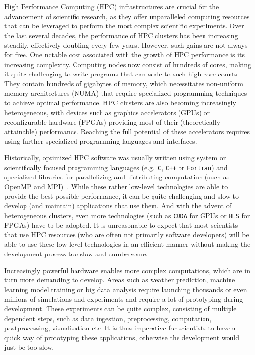 High Performance Computing (HPC) infrastructures are crucial for the advancement of scientific
research, as they offer unparalleled computing resources that can be leveraged to perform the most
complex scientific experiments. Over the last several decades, the performance of HPC clusters
has been increasing steadily, effectively doubling every few years. However, such gains are not
always for free. One notable cost associated with the growth of HPC performance is its
increasing complexity. Computing nodes now consist of hundreds of cores, making it quite
challenging to write programs that can scale to such high core counts. They contain hundreds of
gigabytes of memory, which necessitates non-uniform memory architectures (NUMA) that require
specialized programming techniques to achieve optimal performance. HPC clusters are also becoming
increasingly heterogeneous, with devices such as graphics accelerators (GPUs) or reconfigurable
hardware (FPGAs) providing most of their (theoretically attainable) performance. Reaching the
full potential of these accelerators requires using further specialized programming languages
and interfaces.

Historically, optimized HPC software was usually written using system or scientifically focused
programming languages (e.g.~\texttt{C}, \texttt{C++} or \texttt{Fortran}) and specialized libraries
for parallelizing and distributing computation (such as OpenMP and MPI)~\cite{mpistudy}. While
these rather low-level technologies are able to provide the best possible performance, it can be
quite challenging and slow to develop (and maintain) applications that use them. And with the
advent of heterogeneous clusters, even more technologies (such as \texttt{CUDA} for GPUs or
\texttt{HLS} for FPGAs) have to be adopted. It is unreasonable to expect that most scientists
that use HPC resources (who are often not primarily software developers) will be able to use these
low-level technologies in an efficient manner without making the development process too slow
and cumbersome.

Increasingly powerful hardware enables more complex computations, which are in turn more
demanding to develop. Areas such as weather prediction, machine learning model training or big
data analysis require launching thousands or even millions of simulations and experiments and
require a lot of prototyping during development.
These experiments can be quite complex, consisting of multiple dependent steps, such as data
ingestion, preprocessing, computation, postprocessing, visualisation etc. It is thus imperative for
scientists to have a quick way of prototyping these applications, otherwise the development
would just be too slow.

